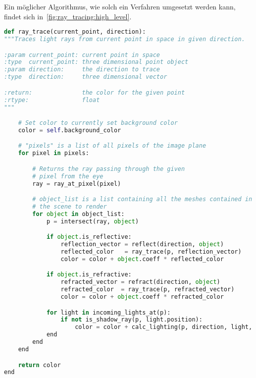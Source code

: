 Ein möglicher Algorithmus, wie solch ein Verfahren umgesetzt werden kann,
findet sich in~\ref{fig:ray_tracing:high_level}.

\begin{lstlisting}[language=Python,caption={Eine abstrakte Umsetzung des
        Ray Tracings \protect\footnotemark.},
    label={fig:ray_tracing:high_level},captionpos=b,emph={ray_trace}]
def ray_trace(current_point, direction):
"""Traces light rays from current point in space in given direction.

:param current_point: current point in space
:type  current_point: three dimensional point object
:param direction:     the direction to trace
:type  direction:     three dimensional vector

:return:              the color for the given point
:rtype:               float
"""

    # Set color to currently set background color
    color = self.background_color

    # "pixels" is a list of all pixels of the image plane
    for pixel in pixels:

        # Returns the ray passing through the given
        # pixel from the eye
        ray = ray_at_pixel(pixel)

        # object_list is a list containing all the meshes contained in
        # the scene to render
        for object in object_list:
            p = intersect(ray, object)

            if object.is_reflective:
                reflection_vector = reflect(direction, object)
                reflected_color   = ray_trace(p, reflection_vector)
                color = color + object.coeff * reflected_color

            if object.is_refractive:
                refracted_vector = refract(direction, object)
                refracted_color  = ray_trace(p, refracted_vector)
                color = color + object.coeff * refracted_color

            for light in incoming_lights_at(p):
                if not is_shadow_ray(p, light.position):
                    color = color + calc_lighting(p, direction, light, object)
            end
        end
    end

    return color
end
\end{lstlisting}
